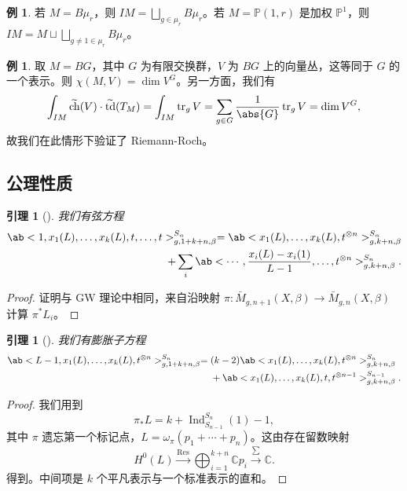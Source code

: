 \documentclass{amsart}
\newtheorem{lem}[thm]{引理}
\theoremstyle{definition}
\newtheorem{exm}[thm]{例}
\theoremstyle{remark}
\theoremstyle{plain}
\theoremstyle{definition}
\theoremstyle{remark}
\newcommand{\C}{\mathbb{C}}
\renewcommand{\P}{\mathbb{P}}
\newcommand{\on}[1]{\operatorname{#1}}
\newcommand{\wt}[1]{\widetilde{#1}}
\newcommand{\1}{\mathbf{1}}
\newcommand{\2}{\mathbf{2}}
\newcommand{\3}{\mathbf{3}}
\begin{document}
\begin{exm}
    若 \(M = B\mu_r\)，则 \(IM = \bigsqcup_{g \in \mu_r} B \mu_r\)。若 \(M = \P(1, r)\) 是加权 \(\P^1\)，则 \(IM = M \sqcup \bigsqcup_{g \neq 1 \in \mu_r} B\mu_r\)。
\end{exm}

\begin{exm}
    取 \(M = BG\)，其中 \(G\) 为有限交换群，\(V\) 为 \(BG\) 上的向量丛，这等同于 \(G\) 的一个表示。则 \(\chi(M, V) = \dim V^G\)。另一方面，我们有
    \[ \int_{IM} \wt{\on{ch}}(V) \cdot \wt{\on{td}}(T_M) = \int_{IM} \on{tr}_g V = \sum_{g \in G} \frac{1}{\abs{G}} \on{tr}_g V = \dim V^G, \]
    故我们在此情形下验证了 Riemann-Roch。
\end{exm}

\subsection{公理性质}%
\label{sub:Axiomatic properties}

\begin{lem}[{\cite{GiventalK7}}]
    我们有\textit{弦方程}
    \begin{align*}
        \ab< 1, x_1(L), \ldots, x_k(L), t, \ldots, t >_{g, 1+k+n, \beta}^{S_n} = \ab<x_1(L), \ldots, x_k(L), t^{\otimes n}>^{S_n}_{g,k+n,\beta} \\
        + \sum_i \ab< \cdots, \frac{x_i(L) - x_i(1)}{L-1}, \ldots, t^{\otimes n}>^{S_n}_{g,k+n,\beta}. 
    \end{align*}
\end{lem}

\begin{proof}
    证明与 GW 理论中相同，来自沿映射 \(\pi \colon\bar{M}_{g,n+1}(X,\beta) \to \bar{M}_{g,n}(X,\beta)\) 计算 \(\pi^* L_i\)。
\end{proof}

\begin{lem}[{\cite{GiventalK7}}]
    我们有\textit{膨胀子方程}
    \begin{align*}
        \ab<L-1, x_1(L), \ldots, x_k(L), t^{\otimes n}>_{g,1+k+n,\beta}^{S_n} ={}& (k-2)\ab<x_1(L), \ldots, x_k(L), t^{\otimes n}>_{g,k+n,\beta}^{S_n} \\
        &+ \ab<x_1(L), \ldots, x_k(L), t, t^{\otimes n-1}>_{g,k+n,\beta}^{S_{n-1}}.
    \end{align*}
\end{lem}

\begin{proof}
    我们用到
    \[ \pi_* L = k + \on{Ind}_{S_{n-1}}^{S_n}(1) - 1, \]
    其中 \(\pi\) 遗忘第一个标记点，\(L = \omega_{\pi} (p_1 + \cdots + p_n)\)。这由存在留数映射
    \[ H^0(L) \xrightarrow{\on{Res}} \bigoplus_{i=1}^{k+n} \C p_i \xrightarrow{\sum} \C. \]
    得到。中间项是 \(k\) 个平凡表示与一个标准表示的直和。
\end{proof}
\end{document}
